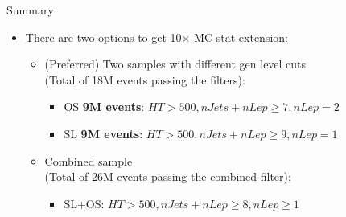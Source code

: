 \documentclass[xcolor=table]{beamer}
\begin{document}
\begin{frame}{Summary}
\begin{itemize}
\item \underline{There are two options to get 10$\times$ MC stat extension:}
\begin{itemize}
\item (Preferred) Two samples with different gen level cuts\\ (Total of 18M events passing the filters):
\begin{itemize}
\item OS \textbf{9M events}: $HT>500, nJets+nLep\geq7, nLep=2$
\item SL \textbf{9M events}: $HT>500, nJets+nLep\geq9, nLep=1$
\end{itemize}
\item Combined sample\\ (Total of 26M events passing the combined filter):
\begin{itemize}
\item SL+OS: $HT>500, nJets+nLep\geq8, nLep\geq1$
\end{itemize}
\end{itemize}
\end{itemize}
\end{frame}
\end{document}
